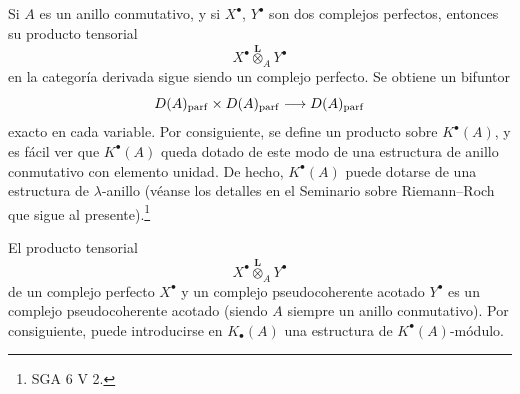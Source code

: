 Si $A$ es un anillo conmutativo, y si $X^\bullet$, $Y^\bullet$ son dos complejos perfectos, entonces su producto tensorial
\[
X^\bullet\overset{\mathbf L}{\otimes}_A Y^\bullet
\]
en la categoría derivada sigue siendo un complejo perfecto. Se obtiene un bifuntor
\[
D(A)_{\mathrm{parf}}\times D(A)_{\mathrm{parf}}\longrightarrow D(A)_{\mathrm{parf}}
\]
exacto en cada variable. Por consiguiente, se define un producto sobre $K^{\bullet}(A)$, y es fácil ver que $K^{\bullet}(A)$ queda dotado de este modo de una estructura de anillo conmutativo con elemento unidad. De hecho, $K^{\bullet}(A)$ puede dotarse de una estructura de $\lambda$-anillo (véanse los detalles en el Seminario sobre Riemann--Roch que sigue al presente).\footnote{SGA 6 V 2.}

El producto tensorial
\[
X^\bullet\overset{\mathbf L}{\otimes}_A Y^\bullet
\]
de un complejo perfecto $X^\bullet$ y un complejo pseudocoherente acotado $Y^\bullet$ es un complejo pseudocoherente acotado (siendo $A$ siempre un anillo conmutativo). Por consiguiente, puede introducirse en $K_\bullet(A)$ una estructura de $K^{\bullet}(A)$-módulo.
